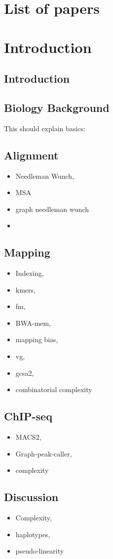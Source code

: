 \chapter{List of papers}
\chapter{Introduction}
\section{Introduction}

\section{Biology Background}

This should explain basics:
\section{Alignment}

\begin{itemize}
\item Needleman Wunch,
\item MSA
\item graph needleman wunch
\item 
\end{itemize}
\section{Mapping}

\begin{itemize}
\item Indexing, 
\item kmers, 
\item fm,
\item BWA-mem,
\item mapping bias, 
\item vg,
\item gcsa2,
\item combinatorial complexity
\end{itemize}
\section{ChIP-seq}

\begin{itemize}
\item MACS2, 
\item Graph-peak-caller, 
\item complexity
\end{itemize}
\section{Discussion}
\begin{itemize}
\item Complexity, 
\item haplotypes,
\item pseudo-linearity
\end{itemize}
